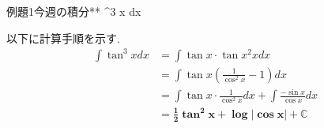 \documentclass[main]{subfiles}
\begin{document}

\begin{newmondai}{例題}{1}{今週の積分}{**}
    \int \tan ^3 x dx
\end{newmondai}


\solutionhead
\hfill
以下に計算手順を示す.
\hfill\ 
\begin{align*}
    \int \tan ^3 x dx   
        &= \int \tan x \cdot \tan x ^2 x dx \\
        &= \int \tan x \left( \frac{1}{\cos ^2 x} -1 \right)  dx \\
        &= \int \tan x \cdot \frac{1}{\cos ^2 x} dx + \int \frac{-\sin x}{\cos x} dx \\
        &= \boldsymbol{\frac{1}{2} \tan ^2 x + \log \left| \cos x \right| + \mathbb{C}}
\end{align*}
\end{document}
